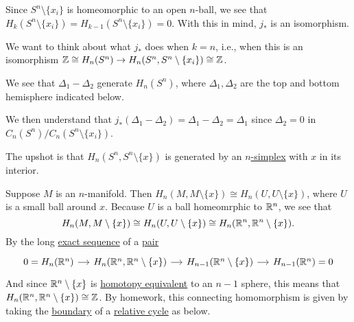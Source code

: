 \par Since \(S^n \setminus \{x_i\}\) is homeomorphic to an open \(n\)-ball, we see that \(H_k(S^n \setminus \{x_i\}) = H_{k - 1}(S^n \setminus \{x_i\}) = 0\).
With this in mind, \(j_\ast\) is an isomorphism.

We want to think about what \(j_\ast\) does when \(k = n\), i.e., when this is an isomorphism \(\mathbb{\MakeUppercase{z}}\cong H_n(S^n) \to H_n(S^n, S^n \setminus \{x_i\}) \cong \mathbb{Z}\).

We see that \(\Delta_1 - \Delta_2\) generate \(H_n(S^n)\), where \(\Delta_1, \Delta_2\) are the top and bottom hemisphere indicated below.
\begin{figure}[H]
	\centering
	\label{fig:les-on-relative-spheres}
\end{figure}
We then understand that \(j_\ast(\Delta_1 - \Delta_2) = \Delta_1 - \Delta_2 = \Delta_1\) since \(\Delta_2 = 0\) in \(C_n(S^n)/C_n(S^n \setminus \{x_i\})\).

The upshot is that \(H_n(S^n, S^n \setminus \{x\})\) is generated by an \hyperref[def:standard-simplex]{\(n\)-simplex} with \(x\) in its interior.

Suppose \(M\) is an \(n\)-manifold. Then \(H_n(M, M \setminus \{x\}) \cong H_n(U, U \setminus \{x\})\), where \(U\) is a small ball around \(x\).
Because \(U\) is a ball homeomrphic to \(\mathbb{\MakeUppercase{r}} ^n\), we see that
\[
	H_n(M, M \setminus \{x\}) \cong H_n(U, U \setminus \{x\}) \cong H_n(\mathbb{\MakeUppercase{r}} ^n, \mathbb{\MakeUppercase{r}} ^n \setminus \{x\}).
\]
By the long \hyperref[def:exact-sequence]{exact sequence} of a \hyperref[def:good-pair]{pair}
\[
	\begin{tikzcd}[column sep=small]
		{0=H_n(\mathbb{R}^n)} & {H_n(\mathbb{R}^n, \mathbb{R}^n\setminus\{x\})} & {H_{n-1}(\mathbb{R}^n\setminus\{x\})} & {H_{n-1}(\mathbb{R}^n)=0}
		\arrow[from=1-1, to=1-2]
		\arrow[from=1-2, to=1-3]
		\arrow[from=1-3, to=1-4]
	\end{tikzcd}
\]
And since \(\mathbb{\MakeUppercase{r}}^n \setminus \{x\}\) is \hyperref[def:homotopy-equivalence]{homotopy equivalent} to an \(n - 1\) sphere, this means that
\(H_n(\mathbb{\MakeUppercase{r}} ^n, \mathbb{\MakeUppercase{r}} ^n \setminus \{x\}) \cong \mathbb{\MakeUppercase{z}} \). By homework, this
connecting homomorphism is given by taking the \hyperref[def:boundary]{boundary} of a \hyperref[def:relative-cycle]{relative cycle} as below.
\begin{figure}[H]
	\centering
	\label{fig:connecting-homomorphism-relative-homology-rn}
\end{figure}

